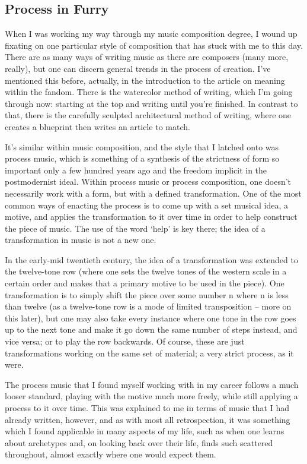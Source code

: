 
\subsection*{Process in Furry}

When I was working my way through my music composition degree, I wound up fixating on one particular style of composition that has stuck with me to this day.  There are as many ways of writing music as there are composers (many more, really), but one can discern general trends in the process of creation.  I've mentioned this before, actually, in the introduction to the article on meaning within the fandom.  There is the watercolor method of writing, which I'm going through now: starting at the top and writing until you're finished.  In contrast to that, there is the carefully sculpted architectural method of writing, where one creates a blueprint then writes an article to match.

It's similar within music composition, and the style that I latched onto was process music, which is something of a synthesis of the strictness of form so important only a few hundred years ago and the freedom implicit in the postmodernist ideal.  Within process music or process composition, one doesn't necessarily work with a form, but with a defined transformation.  One of the most common ways of enacting the process is to come up with a set musical idea, a motive, and applies the transformation to it over time in order to help construct the piece of music.  The use of the word `help' is key there; the idea of a transformation in music is not a new one.

In the early-mid twentieth century, the idea of a transformation was extended to the twelve-tone row (where one sets the twelve tones of the western scale in a certain order and makes that a primary motive to be used in the piece).  One transformation is to simply shift the piece over some number n where n is less than twelve (as a twelve-tone row is a mode of limited transposition -- more on this later), but one may also take every instance where one tone in the row goes up to the next tone and make it go down the same number of steps instead, and vice versa; or to play the row backwards.  Of course, these are just transformations working on the same set of material; a very strict process, as it were.

The process music that I found myself working with in my career follows a much looser standard, playing with the motive much more freely, while still applying a process to it over time.  This was explained to me in terms of music that I had already written, however, and as with most all retrospection, it was something which I found applicable in many aspects of my life, such as when one learns about archetypes and, on looking back over their life, finds such scattered throughout, almost exactly where one would expect them.

